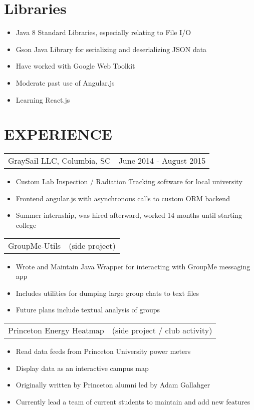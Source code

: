 \documentclass[margin]{res}
\begin{document}
\begin{resume}
\normalsize{\section{Libraries}}
    \begin{itemize} \itemsep -2pt
        \item Java 8 Standard Libraries, especially relating to File I/O
        \item Gson Java Library for serializing and deserializing JSON data
        \item Have worked with Google Web Toolkit
        \item Moderate past use of Angular.js
        \item Learning React.js
    \end{itemize}
 


\section{EXPERIENCE}      
    \begin{tabular}{p{3in} r} %
        GraySail LLC, Columbia, SC        & June 2014 - August 2015
    \end{tabular}
    \begin{itemize} \itemsep -2pt
        \item Custom Lab Inspection / Radiation Tracking software for local university
        \item Frontend angular.js with asynchronous calls to custom ORM backend
        \item Summer internship, was hired afterward, worked 14 months until starting college
	\end{itemize}

	\begin{tabular}{p{3in} r}
        GroupMe-Utils & (side project)
    \end{tabular}
    \begin{itemize} \itemsep -2pt
        \item Wrote and Maintain Java Wrapper for interacting with GroupMe messaging app
        \item Includes utilities for dumping large group chats to text files
        \item Future plans include textual analysis of groups
    \end{itemize}

    \begin{tabular}{p{3in} r}
        Princeton Energy Heatmap & (side project / club activity)
    \end{tabular}
    \begin{itemize} \itemsep -2pt
        \item Read data feeds from Princeton University power meters
        \item Display data as an interactive campus map
        \item Originally written by Princeton alumni led by Adam Gallahger
        \item Currently lead a team of current students to maintain and add new features
    \end{itemize}


\end{resume}
\end{document}
